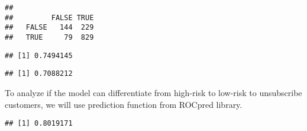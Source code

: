 \documentclass[]{article}
\newenvironment{Shaded}{\begin{snugshade}}{\end{snugshade}}
\newcommand{\KeywordTok}[1]{\textcolor[rgb]{0.13,0.29,0.53}{\textbf{#1}}}
\newcommand{\DecValTok}[1]{\textcolor[rgb]{0.00,0.00,0.81}{#1}}
\newcommand{\StringTok}[1]{\textcolor[rgb]{0.31,0.60,0.02}{#1}}
\newcommand{\CommentTok}[1]{\textcolor[rgb]{0.56,0.35,0.01}{\textit{#1}}}
\newcommand{\OperatorTok}[1]{\textcolor[rgb]{0.81,0.36,0.00}{\textbf{#1}}}
\newcommand{\NormalTok}[1]{#1}
\begin{document}
\begin{verbatim}
##        
##         FALSE TRUE
##   FALSE   144  229
##   TRUE     79  829
\end{verbatim}

\begin{Shaded}
\end{Shaded}

\begin{verbatim}
## [1] 0.7494145
\end{verbatim}

\begin{Shaded}
\end{Shaded}

\begin{verbatim}
## [1] 0.7088212
\end{verbatim}

To analyze if the model can differentiate from high-risk to low-risk to
unsubscribe customers, we will use prediction function from ROCpred
library.

\begin{Shaded}
\end{Shaded}

\begin{verbatim}
## [1] 0.8019171
\end{verbatim}
\end{document}
